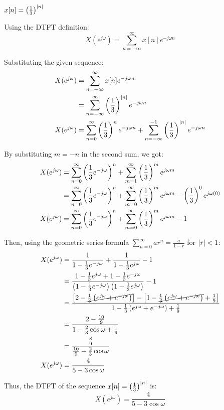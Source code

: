 \documentclass[a4paper, 10pt]{article}
\begin{document}
\begin{tosubmit}
\begin{subsubproblems}
    \item \( x[n] = \left( \frac{1}{3} \right)^{\left|n\right|} \)
\end{subsubproblems}

\par\noindent\submitsolution
Using the DTFT definition:
\[ X(e^{j\omega}) = \sum_{n=-\infty}^{\infty} x[n] e^{-j\omega n} \]

Substituting the given sequence:
\begin{align*}
    X(e^{j\omega}) &= \sum_{n=-\infty}^{\infty} x[n] e^{-j\omega n} \\
    &= \sum_{n=-\infty}^{\infty} \left( \frac{1}{3} \right)^{\left|n\right|} e^{-j\omega n} \\
    X(e^{j\omega}) &= \sum_{n=0}^{\infty} \left( \frac{1}{3} \right)^{n} e^{-j\omega n} + \sum_{n=-\infty}^{-1} \left( \frac{1}{3} \right)^{\left|n\right|} e^{-j\omega n}
\end{align*}

By substituting \( m = -n \) in the second sum, we got:
\begin{align*}
    X(e^{j\omega}) &= \sum_{n=0}^{\infty} \left( \frac{1}{3} e^{-j\omega} \right)^{n} + \sum_{m=1}^{\infty} \left( \frac{1}{3} \right)^{m} e^{j\omega m} \\
    &= \sum_{n=0}^{\infty} \left( \frac{1}{3} e^{-j\omega} \right)^{n} + \sum_{m=0}^{\infty} \left( \frac{1}{3} \right)^{m} e^{j\omega m} - \left( \frac{1}{3} \right)^{0} e^{j\omega (0)} \\
    X(e^{j\omega}) &= \sum_{n=0}^{\infty} \left( \frac{1}{3} e^{-j\omega} \right)^{n} + \sum_{m=0}^{\infty} \left( \frac{1}{3} \right)^{m} e^{j\omega m} - 1
\end{align*}

Then, using the geometric series formula \( \sum_{n=0}^{\infty} ar^n = \frac{a}{1 - r} \) for \( \left|r\right| < 1 \):
\begin{align*}
    X(e^{j\omega}) &= \frac{1}{1 - \frac{1}{3} e^{-j\omega}} + \frac{1}{1 - \frac{1}{3} e^{j\omega}} - 1 \\
    &= \frac{1 - \frac{1}{3} e^{j\omega} + 1 - \frac{1}{3} e^{-j\omega}}{\left( 1 - \frac{1}{3} e^{-j\omega} \right) \left( 1 - \frac{1}{3} e^{j\omega} \right)} - 1 \\
    &= \frac{ \left[ 2 - \cancel{\frac{1}{3} \left( e^{j\omega} + e^{-j\omega} \right)} \right] - \left[ 1 - \cancel{\frac{1}{3} \left( e^{j\omega} + e^{-j\omega} \right)} + \frac{1}{9} \right] }{1 - \frac{1}{3} \left( e^{j\omega} + e^{-j\omega} \right) + \frac{1}{9}} \\
    &= \frac{ 2 - \frac{10}{9} }{1 - \frac{2}{3} \cos{\omega} + \frac{1}{9}} \\
    &= \frac{ \frac{8}{9} }{ \frac{10}{9} - \frac{2}{3} \cos{\omega} } \\
    X(e^{j\omega}) &= \frac{4}{5 - 3 \cos{\omega}}
\end{align*}

Thus, the DTFT of the sequence \( x[n] = \left( \frac{1}{3} \right)^{\left|n\right|} \) is:
\[ \boxed{ X(e^{j\omega}) = \frac{4}{5 - 3 \cos{\omega}} } \]
\end{tosubmit}
\end{document}
